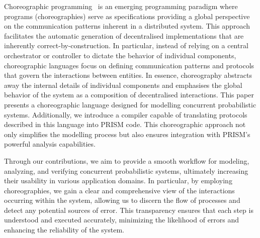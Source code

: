 Choreographic programming~\cite{M23} is an emerging programming
paradigm where programs (choreographies) serve as specifications
providing a global perspective on the communication patterns inherent
in a distributed system. This approach facilitates the automatic
generation of decentralised implementations that are inherently
correct-by-construction.
%
In particular, instead of relying on a central orchestrator or
controller to dictate the behavior of individual components,
choreographic languages focus on defining communication patterns and
protocols that govern the interactions between entities.
%
In essence, choreography abstracts away the internal details of
individual components and emphasises the global behavior of the system
as a composition of decentralised interactions. %
%
This paper presents a choreographic language designed for modelling
concurrent probabilistic systems.
Additionally, we introduce a compiler capable of translating protocols
described in this language into PRISM code. This choreographic
approach not only simplifies the modelling process but also ensures
integration with PRISM's powerful analysis capabilities. 




Through our contributions, we aim to provide a smooth workflow for
modeling, analyzing, and verifying concurrent probabilistic systems,
ultimately increasing their usability in various application domains.
%
In particular, by employing choreographies, we gain a clear and
comprehensive view of the interactions occurring within the system,
allowing us to discern the flow of processes and detect any potential
sources of error. This transparency ensures that each step is
understood and executed accurately, minimizing the likelihood of
errors and enhancing the reliability of the system.


